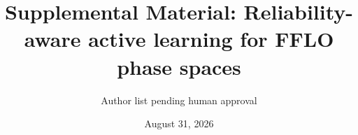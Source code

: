 \documentclass[aps,prl,preprint,superscriptaddress,floatfix]{revtex4-2}
\begin{document}
\title{Supplemental Material: Reliability-aware active learning for FFLO phase spaces}\author{Author list pending human approval}\date{August 31, 2026}\maketitle
\setcounter{figure}{0}\setcounter{table}{0}

\end{document}
